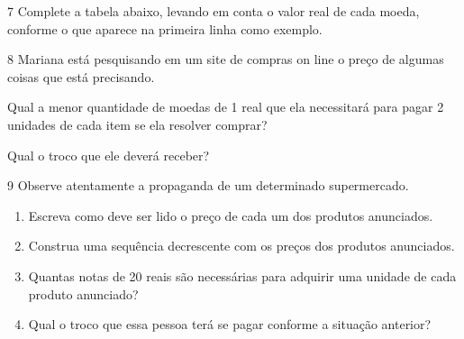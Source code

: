 \num{7} Complete a tabela abaixo, levando em conta o valor real de cada
moeda, conforme o que aparece na primeira linha como exemplo.

%


\num{8} Mariana está pesquisando em um site de compras on line o preço de
algumas coisas que está precisando.

%

\begin{escolha}
\item
  Qual a menor quantidade de moedas de 1 real que ela necessitará para
  pagar 2 unidades de cada item se ela resolver comprar?


\item
  Qual o troco que ele deverá receber?
\end{escolha}



\num{9} Observe atentamente a propaganda de um determinado supermercado.


\begin{enumerate}
\item
  Escreva como deve ser lido o preço de cada um dos produtos anunciados.


\item
  Construa uma sequência decrescente com os preços dos produtos
  anunciados.


\item
  Quantas notas de 20 reais são necessárias para adquirir uma unidade de
  cada produto anunciado?


\item
  Qual o troco que essa pessoa terá se pagar conforme a situação
  anterior?

\end{enumerate}

